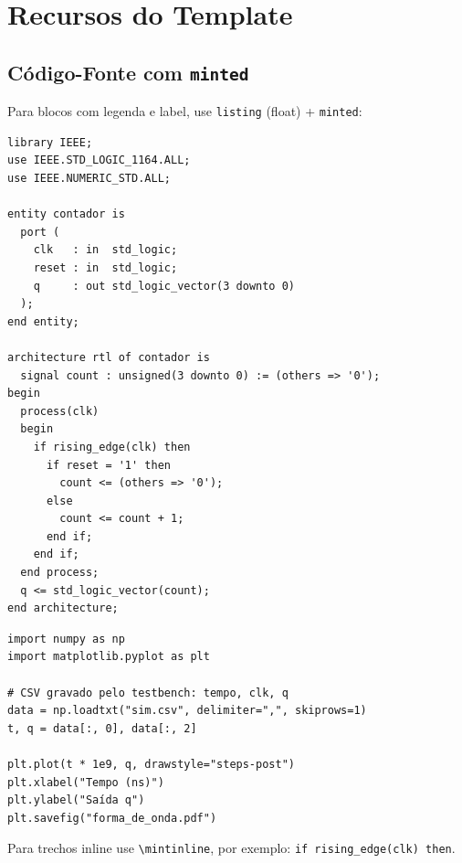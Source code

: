 \section{Recursos do Template}

\subsection{Código-Fonte com \texttt{minted}}

Para blocos com legenda e label, use \verb|listing| (float) + \verb|minted|:

\begin{listing}[htbp]
  \caption{Contador de 4 bits em VHDL}
  \label{cod:contador}
  \begin{verbatim}
library IEEE;
use IEEE.STD_LOGIC_1164.ALL;
use IEEE.NUMERIC_STD.ALL;

entity contador is
  port (
    clk   : in  std_logic;
    reset : in  std_logic;
    q     : out std_logic_vector(3 downto 0)
  );
end entity;

architecture rtl of contador is
  signal count : unsigned(3 downto 0) := (others => '0');
begin
  process(clk)
  begin
    if rising_edge(clk) then
      if reset = '1' then
        count <= (others => '0');
      else
        count <= count + 1;
      end if;
    end if;
  end process;
  q <= std_logic_vector(count);
end architecture;
  \end{verbatim}
\end{listing}

\begin{listing}[htbp]
  \caption{Script de análise de simulação}
  \label{cod:python}
  \begin{verbatim}
import numpy as np
import matplotlib.pyplot as plt

# CSV gravado pelo testbench: tempo, clk, q
data = np.loadtxt("sim.csv", delimiter=",", skiprows=1)
t, q = data[:, 0], data[:, 2]

plt.plot(t * 1e9, q, drawstyle="steps-post")
plt.xlabel("Tempo (ns)")
plt.ylabel("Saída q")
plt.savefig("forma_de_onda.pdf")
  \end{verbatim}
\end{listing}
\FloatBarrier

Para trechos inline use \verb|\mintinline|,
por exemplo: \texttt{if rising_edge(clk) then}.

